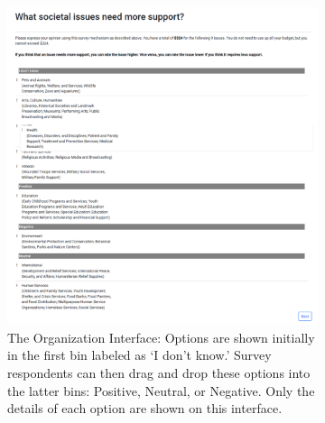 \begin{figure}[h]
    \centering
    \begin{subfigure}[b]{0.48\textwidth}
        \centering
        \includegraphics[width=\textwidth]{content/image/prototypes/4.1_grouping.png}
        \caption{The Organization Interface: Options are shown initially in the first bin labeled as `I don't know.' Survey respondents can then drag and drop these options into the latter bins: Positive, Neutral, or Negative. Only the details of each option are shown on this interface.}
        \label{fig:qv_org_p1}
    \end{subfigure}
    \hfill
    \begin{subfigure}[b]{0.48\textwidth}
        \centering

\end{subfigure}
\end{figure}
